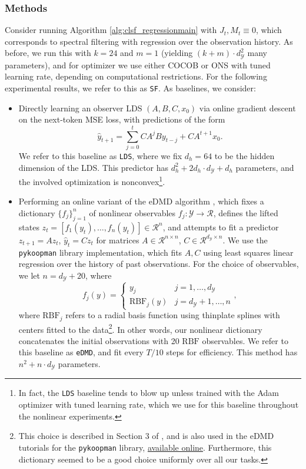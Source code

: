 \documentclass[11pt]{article}
\def\R{{\mathcal R}}
\def\R{\ensuremath{\mathcal R}}
\numberwithin{equation}{section}
\begin{document}
\subsubsection{Methods}
\label{sec:experiments_nonlinearalgs}
Consider running Algorithm \ref{alg:clsf_regressionmain} with $J_t,M_t \equiv 0$, which corresponds to spectral filtering with regression over the observation history. As before, we run this with $k=24$ and $m=1$ (yielding $(k+m)\cdot d_\mathcal{Y}^2$ many parameters), and for optimizer we use either COCOB or ONS with tuned learning rate, depending on computational restrictions. For the following experimental results, we refer to this as \verb|SF|. As baselines, we consider:
\begin{itemize}
    \item Directly learning an observer LDS $(A, B, C, x_0)$ via online gradient descent on the next-token MSE loss, with predictions of the form
    $$\hat{y}_{t+1} = \sum_{j=0}^t CA^{j}By_{t-j} + CA^{t+1}x_0.$$
    We refer to this baseline as \verb|LDS|, where we fix $d_h=64$ to be the hidden dimension of the LDS. This predictor has $d_h^2 + 2d_h\cdot d_\mathcal{Y} + d_h$ parameters, and the involved optimization is nonconvex\footnote{In fact, the \verb|LDS| baseline tends to blow up unless trained with the Adam optimizer with tuned learning rate, which we use for this baseline throughout the nonlinear experiments.}.
    
    \item Performing an online variant of the eDMD algorithm \cite{eDMDrowley}, which fixes a dictionary $\{f_j\}_{j=1}^n$ of nonlinear observables $f_j: \mathcal{Y} \to \R$, defines the lifted states $z_t = [f_1(y_t), \ldots, f_n(y_t)] \in \R^n$, and attempts to fit a predictor $z_{t+1} = Az_t$, $\hat{y}_t = Cz_t$ for matrices $A \in \R^{n \times n}$, $C \in \R^{d_\mathcal{Y} \times n}$. We use the \verb|pykoopman| library \cite{pan2023pykoopmanpythonpackagedatadriven} implementation, which fits $A, C$ using least squares linear regression over the history of past observations. 
    For the choice of observables, we let $n = d_\mathcal{Y} + 20$, where $$f_j(y) = \begin{cases}
        y_j & j = 1, \ldots, d_{\mathcal{Y}} \\
        \mathrm{RBF}_j(y) & j = d_{\mathcal{Y}} + 1, \ldots, n
    \end{cases},$$ 
    where $\mathrm{RBF}_j$ refers to a radial basis function using thinplate splines with centers fitted to the data\footnote{This choice is described in Section 3 of \cite{eDMDrowley}, and is also used in the eDMD tutorials for the \verb|pykoopman| library, \href{https://pykoopman.readthedocs.io/en/master/tutorial_koopman_edmd_with_rbf.html#Koopman-regression-using-EDMD}{available online}. Furthermore, this dictionary seemed to be a good choice uniformly over all our tasks.}. In other words, our nonlinear dictionary concatenates the initial observations with 20 $\mathrm{RBF}$ observables. We refer to this baseline as \verb|eDMD|, and fit every $T/10$ steps for efficiency. This method has $n^2 + n\cdot d_\mathcal{Y}$ parameters.
    

\end{itemize}
\end{document}
